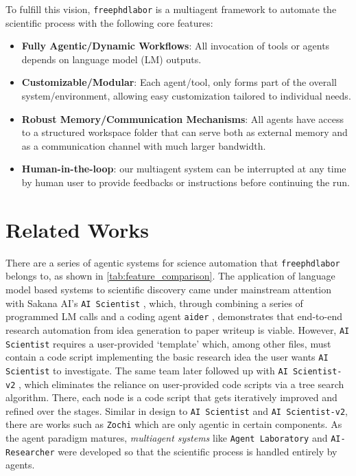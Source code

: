 \documentclass{article}
\begin{document}
To fulfill this vision, \texttt{freephdlabor} is a multiagent framework to automate the scientific process with the following core features:
\begin{itemize}
    \item \textbf{Fully Agentic/Dynamic Workflows}: All invocation of tools or agents depends on language model (LM) outputs.
    \item \textbf{Customizable/Modular}: Each agent/tool, only forms part of the overall system/environment, allowing easy customization tailored to individual needs.
    \item \textbf{Robust Memory/Communication Mechanisms}: All agents have access to a structured workspace folder that can serve both as external memory and as a communication channel with much larger bandwidth.
    \item \textbf{Human-in-the-loop}: our multiagent system can be interrupted at any time by human user to provide feedbacks or instructions before continuing the run.
\end{itemize}

\section{Related Works}

There are a series of agentic systems for science automation that \texttt{freephdlabor} belongs to, as shown in \cref{tab:feature_comparison}. The application of language model based systems to scientific discovery came under mainstream attention with Sakana AI's \texttt{AI Scientist} \cite{luAIScientistFully2024b}, which, through combining a series of programmed LM calls and a coding agent \texttt{aider} \cite{aider}, demonstrates that end-to-end research automation from idea generation to paper writeup is viable. However, \texttt{AI Scientist} requires a user-provided `template' which, among other files, must contain a code script implementing the basic research idea the user wants \texttt{AI Scientist} to investigate. The same team later followed up with \texttt{AI Scientist-v2} \cite{yamadaAIScientistv2WorkshopLevel2025}, which eliminates the reliance on user-provided code scripts via a tree search algorithm. There, each node is a code script that gets iteratively improved and refined over the stages. Similar in design to \texttt{AI Scientist} and \texttt{AI Scientist-v2}, there are works such as \texttt{Zochi} \cite{zhouZochiTechnicalReport2025} which are only agentic in certain components. As the agent paradigm matures, \textit{multiagent systems} like \texttt{Agent Laboratory} \cite{schmidgall2025agentlaboratoryusingllm} and \texttt{AI-Researcher} \cite{tangAIResearcherAutonomousScientific2025} were developed so that the scientific process is handled entirely by agents. 
\end{document}
